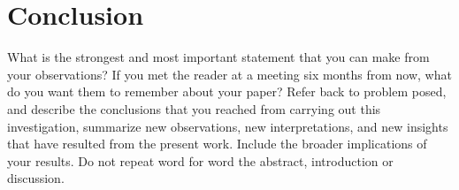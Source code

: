 \chapter{Conclusion}
\label{chapterlabel6}


    What is the strongest and most important statement that you can make from your observations? 
    If you met the reader at a meeting six months from now, what do you want them to remember about your paper? 
    Refer back to problem posed, and describe the conclusions that you reached from carrying out this investigation, summarize new observations, new interpretations, and new insights that have resulted from the present work.
    Include the broader implications of your results. 
    Do not repeat word for word the abstract, introduction or discussion.
